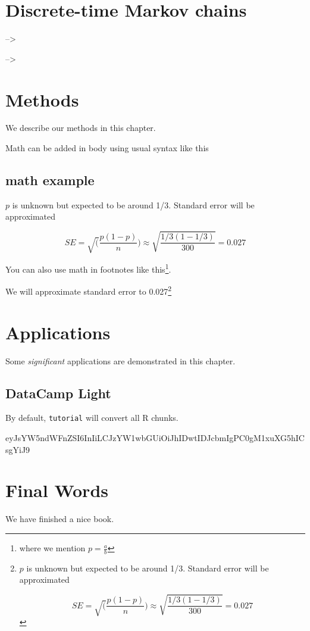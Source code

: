 \documentclass[
]{book}
\theoremstyle{definition}
\theoremstyle{definition}
\theoremstyle{definition}
\theoremstyle{definition}
\theoremstyle{remark}
\begin{document}
\hypertarget{discrete-time-markov-chains}{%
\chapter{Discrete-time Markov chains}\label{discrete-time-markov-chains}}

--\textgreater{}

--\textgreater{}

\hypertarget{methods}{%
\chapter{Methods}\label{methods}}

We describe our methods in this chapter.

Math can be added in body using usual syntax like this

\hypertarget{math-example}{%
\section{math example}\label{math-example}}

\(p\) is unknown but expected to be around 1/3. Standard error will be approximated

\[
SE = \sqrt(\frac{p(1-p)}{n}) \approx \sqrt{\frac{1/3 (1 - 1/3)} {300}} = 0.027
\]

You can also use math in footnotes like this\footnote{where we mention \(p = \frac{a}{b}\)}.

We will approximate standard error to 0.027\footnote{\(p\) is unknown but expected to be around 1/3. Standard error will be approximated

  \[
  SE = \sqrt(\frac{p(1-p)}{n}) \approx \sqrt{\frac{1/3 (1 - 1/3)} {300}} = 0.027
  \]}

\hypertarget{applications}{%
\chapter{Applications}\label{applications}}

Some \emph{significant} applications are demonstrated in this chapter.

\hypertarget{datacamp-light}{%
\section{DataCamp Light}\label{datacamp-light}}

By default, \texttt{tutorial} will convert all R chunks.

eyJsYW5ndWFnZSI6InIiLCJzYW1wbGUiOiJhIDwtIDJcbmIgPC0gM1xuXG5hICsgYiJ9

\hypertarget{final-words}{%
\chapter{Final Words}\label{final-words}}

We have finished a nice book.

  
\end{document}
